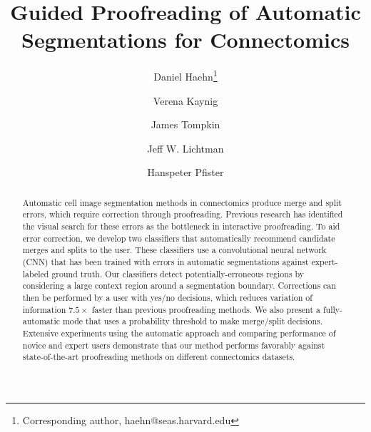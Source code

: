 \documentclass[10pt,twocolumn,letterpaper]{article}
\begin{document}
\title{Guided Proofreading of Automatic Segmentations for Connectomics}




\author[1]{Daniel Haehn\thanks{Corresponding author,  haehn@seas.harvard.edu}}
\author[1]{Verena Kaynig}
\author[2]{James Tompkin}
\author[1]{Jeff W. Lichtman}
\author[1]{Hanspeter Pfister}

\maketitle

\begin{abstract}
%
Automatic cell image segmentation methods in connectomics produce merge and
split errors, which require correction through proofreading. Previous research
has identified the visual search for these errors as the bottleneck in
interactive proofreading. To aid error correction, we develop two classifiers
that automatically recommend candidate merges and splits to the user. These
classifiers use a convolutional neural network (CNN) that has been trained with
errors in automatic segmentations against expert-labeled ground truth. Our
classifiers detect potentially-erroneous regions by considering a large context
region around a segmentation boundary. Corrections can then be performed by a
user with yes/no decisions, which reduces variation of information $7.5\times$ faster than previous
proofreading methods. We also present a fully-automatic mode that uses a
probability threshold to make merge/split decisions. Extensive experiments using
the automatic approach and comparing performance of novice and expert users
demonstrate that our method performs favorably against state-of-the-art
proofreading methods on different connectomics datasets.
%
\vspace{-4mm}
\end{abstract}














{\small


}
\end{document}
